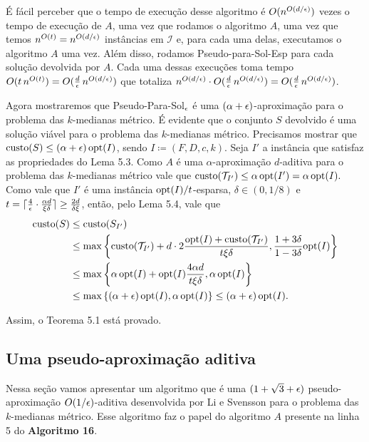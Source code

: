 É fácil perceber que o tempo de execução desse algoritmo é $O(n^{O(d/\epsilon)})$ vezes o tempo de execução de $A$, uma vez que rodamos o algoritmo $A$, uma vez que temos $n^{O(t)} = n^{O(d/\epsilon)}$ instâncias em $\mathcal{I}$ e, para cada uma delas, executamos o algoritmo $A$ uma vez. Além disso, rodamos {\sc Pseudo-para-Sol-Esp} para cada solução devolvida por $A$. Cada uma dessas execuções toma tempo $O(t\,n^{O(t)}) = O(\frac{d}{\epsilon} \, n^{O(d/\epsilon)})$ que totaliza $n^{O(d/\epsilon)} \cdot O(\frac{d}{\epsilon} \, n^{O(d/\epsilon)}) = O(\frac{d}{\epsilon} \, n^{O(d/\epsilon)})$.

Agora mostraremos que {\sc Pseudo-Para-Sol}$_\epsilon$ é uma $(\alpha + \epsilon)$-aproximação para o problema das $k$-medianas métrico. É evidente que o conjunto $S$ devolvido é uma solução viável para o problema das $k$-medianas métrico. Precisamos mostrar que ${\text{custo}(S) \leq (\alpha + \epsilon)\, \mathrm{opt}(I)}$, sendo $I \coloneq (F,D,c,k)$. Seja $I'$ a instância que satisfaz as propriedades do Lema 5.3. Como $A$ é uma $\alpha$-aproximação $d$-aditiva para o problema das $k$-medianas métrico vale que
\(
    \text{custo}(\mathcal{T}_{I'}) \leq \alpha \, \mathrm{opt}(I') = \alpha \, \mathrm{opt}(I). \nonumber
\) 
Como vale que $I'$ é uma instância $\mathrm{opt}(I)/t$-esparsa, $\delta \in (0,1/8)$ e $t = \lceil\frac{4}{\epsilon} \cdot \frac{\alpha d}{\xi \delta}\rceil \geq \frac{2d}{\delta \xi}$, então, pelo Lema 5.4, vale que 
\begin{align}
    \text{custo}(S) &\leq \text{custo}(S_{I'}) \nonumber\\
    &\leq \max \left\{ \text{custo}(\mathcal{T}_{I'}) + d \cdot 2 \frac{\mathrm{opt}(I) + \text{custo}(\mathcal{T}_{I'})}{t\xi\delta}, \frac{1+3\delta}{1-3\delta}\mathrm{opt}(I) \right\} \nonumber \\
    &\leq  \max \left\{ \alpha\, \mathrm{opt}(I) + \mathrm{opt}(I) \frac{4 \alpha d}{t\xi\delta}, \alpha \, \mathrm{opt}(I) \right\} \nonumber \\
    &\leq  \max \left\{ (\alpha + \epsilon)\, \mathrm{opt}(I), \alpha \, \mathrm{opt}(I) \right\} \leq (\alpha + \epsilon) \, \mathrm{opt}(I). \nonumber
\end{align}

Assim, o Teorema 5.1 está provado.

\subsection{Uma pseudo-aproximação aditiva}

Nessa seção vamos apresentar um algoritmo que é uma $(1 + \sqrt{3} + \epsilon)$ pseudo-aproximação $O(1/\epsilon)$-aditiva desenvolvida por Li e Svensson para o problema das $k$-medianas métrico. Esse algoritmo faz o papel do algoritmo $A$ presente na linha 5 do {\bf Algoritmo 16}.

